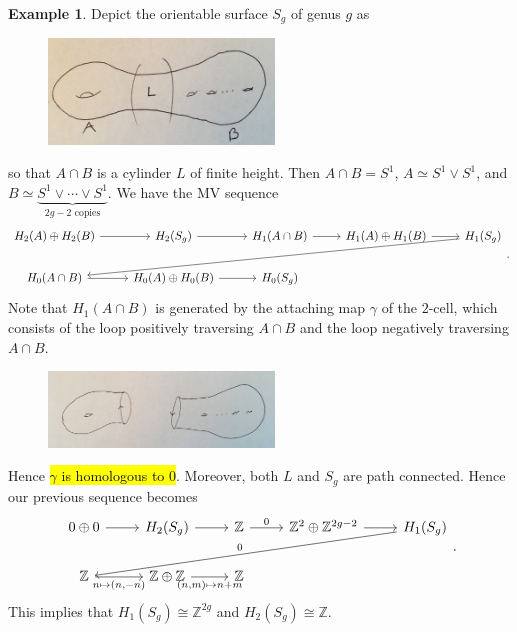 \documentclass[10pt,letterpaper,cm]{nupset}
\theoremstyle{definition}
\newtheorem{exmp}[definition]{Example}
\theoremstyle{theorem}
\theoremstyle{remark}
\newcommand{\Z}{\mathbb Z}
\newcommand{\1}{\mathbb{1}}
\newcommand{\0}{\vec 0}
\begin{document}
\begin{exmp}
Depict the orientable surface $S_g$ of genus $g$ as 
\begin{figure}[H]
\centering
\includegraphics[width=60mm]{S_g-decomposed.jpg}
\end{figure}
so that $A \cap B$ is a cylinder $L$ of finite height. Then $A \cap B = S^1$, $A\simeq S^1 \vee S^1$, and $B\simeq \underbrace{S^1 \vee \cdots \vee S^1}_{2g-2 \text{ copies}}$. We have the MV sequence 
\[
\begin{tikzcd}
H_2(A) \oplus H_2(B) \arrow[r] & H_2(S_g) \arrow[r]             & H_1(A\cap B) \arrow[r] & H_1(A)\oplus H_1(B) \arrow[r] & H_1(S_g) \arrow[lllld] \\
H_0(A \cap B) \arrow[r]        & H_0(A) \oplus H_0(B) \arrow[r] & H_0(S_g)               &                               &                       
\end{tikzcd}
.\] Note that $H_1(A\cap B)$ is generated by the attaching map $\gamma$ of the $2$-cell, which consists of the loop positively traversing $A\cap B$ and the loop negatively traversing $A\cap B$. 
\begin{figure}[H]
\centering
\includegraphics[width=60mm]{S_g-cut.jpg}
\end{figure}
Hence \hl{$\gamma$ is homologous to $0$}. Moreover, both $L$ and $S_g$ are path connected. Hence our previous sequence becomes 
\[
\begin{tikzcd}
0\oplus 0 \arrow[r]                 & H_2(S_g) \arrow[r]                                  & \Z \arrow[r, "0"] & \Z^2 \oplus \Z^{2g-2} \arrow[r] & H_1(S_g) \arrow[lllld, "0"'] \\
\Z \arrow[r, "{n\mapsto (n, -n)}"'] & \Z \oplus \Z \arrow[r, "{(n,m)\mapsto n+m}"'] & \Z                &                                 &                             
\end{tikzcd}
.\] This implies that $H_1(S_g) \cong \Z^{2g}$ and $H_2(S_g) \cong \Z$.
\end{exmp}
\end{document}
